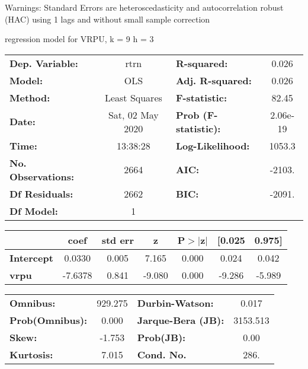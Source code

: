 Warnings: \newline
 [1] Standard Errors are heteroscedasticity and autocorrelation robust (HAC) using 1 lags and without small sample correction\ 

regression model for VRPU, k = 9 h = 3\begin{center}
\begin{tabular}{lclc}
\toprule
\textbf{Dep. Variable:}    &       rtrn       & \textbf{  R-squared:         } &     0.026   \\
\textbf{Model:}            &       OLS        & \textbf{  Adj. R-squared:    } &     0.026   \\
\textbf{Method:}           &  Least Squares   & \textbf{  F-statistic:       } &     82.45   \\
\textbf{Date:}             & Sat, 02 May 2020 & \textbf{  Prob (F-statistic):} &  2.06e-19   \\
\textbf{Time:}             &     13:38:28     & \textbf{  Log-Likelihood:    } &    1053.3   \\
\textbf{No. Observations:} &        2664      & \textbf{  AIC:               } &    -2103.   \\
\textbf{Df Residuals:}     &        2662      & \textbf{  BIC:               } &    -2091.   \\
\textbf{Df Model:}         &           1      & \textbf{                     } &             \\
\bottomrule
\end{tabular}
\begin{tabular}{lcccccc}
                   & \textbf{coef} & \textbf{std err} & \textbf{z} & \textbf{P$> |$z$|$} & \textbf{[0.025} & \textbf{0.975]}  \\
\midrule
\textbf{Intercept} &       0.0330  &        0.005     &     7.165  &         0.000        &        0.024    &        0.042     \\
\textbf{vrpu}      &      -7.6378  &        0.841     &    -9.080  &         0.000        &       -9.286    &       -5.989     \\
\bottomrule
\end{tabular}
\begin{tabular}{lclc}
\textbf{Omnibus:}       & 929.275 & \textbf{  Durbin-Watson:     } &    0.017  \\
\textbf{Prob(Omnibus):} &   0.000 & \textbf{  Jarque-Bera (JB):  } & 3153.513  \\
\textbf{Skew:}          &  -1.753 & \textbf{  Prob(JB):          } &     0.00  \\
\textbf{Kurtosis:}      &   7.015 & \textbf{  Cond. No.          } &     286.  \\
\bottomrule
\end{tabular}
\end{center}

